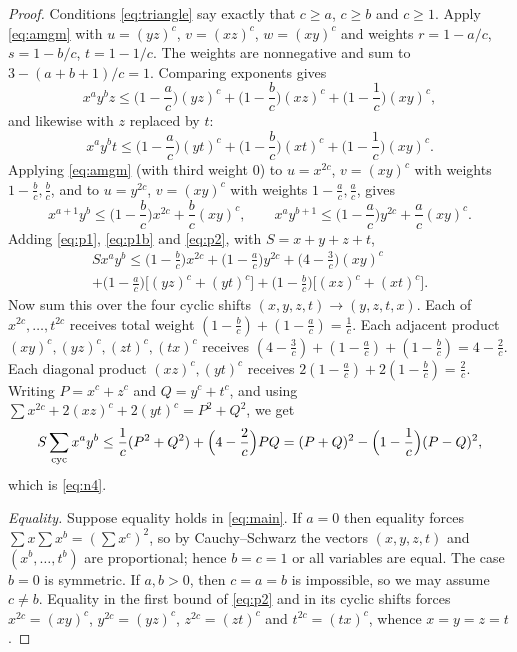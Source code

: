 \documentclass[11pt]{article}
\theoremstyle{remark}
\numberwithin{equation}{section}
\begin{document}
\begin{proof}
Conditions \eqref{eq:triangle} say exactly that $c\ge a$, $c\ge b$ and $c\ge 1$. Apply
\eqref{eq:amgm} with $u=(yz)^c$, $v=(xz)^c$, $w=(xy)^c$ and weights $r=1-a/c$, $s=1-b/c$,
$t=1-1/c$. The weights are nonnegative and sum to $3-(a+b+1)/c=1$. Comparing exponents gives
\begin{equation}\label{eq:p1}
x^ay^bz\le \Big(1-\frac ac\Big)(yz)^c+\Big(1-\frac bc\Big)(xz)^c+\Big(1-\frac1c\Big)(xy)^c,
\end{equation}
and likewise with $z$ replaced by $t$:
\begin{equation}\label{eq:p1b}
x^ay^bt\le \Big(1-\frac ac\Big)(yt)^c+\Big(1-\frac bc\Big)(xt)^c+\Big(1-\frac1c\Big)(xy)^c .
\end{equation}
Applying \eqref{eq:amgm} (with third weight $0$) to $u=x^{2c}$, $v=(xy)^c$ with weights
$1-\frac bc,\frac bc$, and to $u=y^{2c}$, $v=(xy)^c$ with weights $1-\frac ac,\frac ac$, gives
\begin{equation}\label{eq:p2}
x^{a+1}y^b\le \Big(1-\frac bc\Big)x^{2c}+\frac bc(xy)^c,\qquad
x^ay^{b+1}\le \Big(1-\frac ac\Big)y^{2c}+\frac ac(xy)^c .
\end{equation}
Adding \eqref{eq:p1}, \eqref{eq:p1b} and \eqref{eq:p2}, with
$S=x+y+z+t$,
\begin{multline*}
Sx^ay^b\le\Big(1-\frac bc\Big)x^{2c}+\Big(1-\frac ac\Big)y^{2c}+\Big(4-\frac3c\Big)(xy)^c\\
+\Big(1-\frac ac\Big)\big[(yz)^c+(yt)^c\big]+\Big(1-\frac bc\Big)\big[(xz)^c+(xt)^c\big].
\end{multline*}
Now sum this over the four cyclic shifts $(x,y,z,t)\to(y,z,t,x)$. Each of
$x^{2c},\dots,t^{2c}$ receives total weight $(1-\frac bc)+(1-\frac ac)=\frac1c$. Each adjacent
product $(xy)^c,(yz)^c,(zt)^c,(tx)^c$ receives
$(4-\frac3c)+(1-\frac ac)+(1-\frac bc)=4-\frac2c$. Each diagonal product $(xz)^c,(yt)^c$
receives $2(1-\frac ac)+2(1-\frac bc)=\frac2c$. Writing
$P=x^c+z^c$ and $Q=y^c+t^c$, and using $\sum x^{2c}+2(xz)^c+2(yt)^c=P^2+Q^2$, we get
\[
S\sum_{\rm cyc}x^ay^b\le \frac1c(P^2+Q^2)+\Big(4-\frac2c\Big)PQ=(P+Q)^2-\Big(1-\frac1c\Big)(P-Q)^2,
\]
which is \eqref{eq:n4}.

\emph{Equality.} Suppose equality holds in \eqref{eq:main}. If $a=0$ then equality forces
$\sum x\sum x^b=(\sum x^c)^2$, so by Cauchy--Schwarz the vectors $(x,y,z,t)$ and
$(x^b,\dots,t^b)$ are proportional; hence $b=c=1$ or all variables are equal. The case $b=0$ is
symmetric. If $a,b>0$, then $c=a=b$ is impossible, so we may assume $c\ne b$. Equality in the
first bound of \eqref{eq:p2} and in its cyclic shifts forces $x^{2c}=(xy)^c$, $y^{2c}=(yz)^c$,
$z^{2c}=(zt)^c$ and $t^{2c}=(tx)^c$, whence $x=y=z=t$.
\end{proof}
\end{document}
